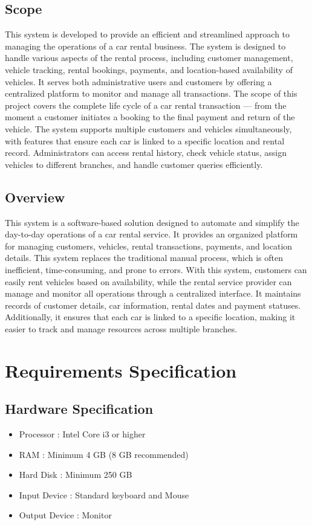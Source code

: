 \documentclass[12pt,a4paper]{report}
\begin{document}
\section{Scope}
This system is developed to provide an efficient and streamlined approach to managing the operations of a car rental business. The system is designed to handle various aspects of the rental process, including customer management, vehicle tracking, rental bookings, payments, and location-based availability of vehicles. It serves both administrative users and customers by offering a centralized platform to monitor and manage all transactions.
The scope of this project covers the complete life cycle of a car rental transaction — from the moment a customer initiates a booking to the final payment and return of the vehicle. The system supports multiple customers and vehicles simultaneously, with features that ensure each car is linked to a specific location and rental record. Administrators can access rental history, check vehicle status, assign vehicles to different branches, and handle customer queries efficiently.
\section{Overview}
This system is a software-based solution designed to automate and simplify the day-to-day operations of a car rental service. It provides an organized platform for managing customers, vehicles, rental transactions, payments, and location details. This system replaces the traditional manual process, which is often inefficient, time-consuming, and prone to errors. With this system, customers can easily rent vehicles based on availability, while the rental service provider can manage and monitor all operations through a centralized interface. It maintains records of customer details, car information, rental dates and payment statuses. Additionally, it ensures that each car is linked to a specific location, making it easier to track and manage resources across multiple branches.

\chapter{Requirements Specification}
\section{Hardware Specification}
\begin{itemize}
\item Processor : Intel Core i3 or higher
\item RAM : Minimum 4 GB (8 GB recommended)
\item Hard Disk : Minimum 250 GB
\item Input Device : Standard keyboard and Mouse
\item Output Device : Monitor
\end{itemize}
\end{document}
